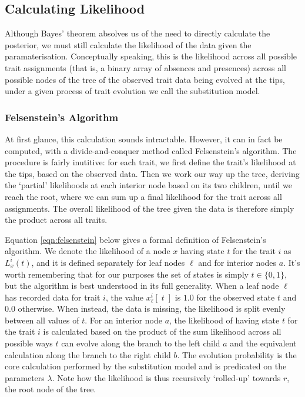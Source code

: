 \documentclass[10pt,journal,compsoc]{IEEEtran}
\begin{document}
\subsection{Calculating Likelihood}

Although Bayes' theorem absolves us of the need to directly calculate the posterior, we must still calculate the likelihood of the data given the paramaterisation. Conceptually speaking, this is the likelihood across all possible trait assignments (that is, a binary array of absences and presences) across all possible nodes of the tree of the observed trait data being evolved at the tips, under a given process of trait evolution we call the substitution model.

\subsubsection{Felsenstein's Algorithm}

At first glance, this calculation sounds intractable. However, it can in fact be computed, with a divide-and-conquer method called Felsenstein's algorithm. The procedure is fairly inutitive: for each trait, we first define the trait's likelihood at the tips, based on the observed data. Then we work our way up the tree, deriving the `partial' likelihoods at each interior node based on its two children, until we reach the root, where we can sum up a final likelihood for the trait across all assignments. The overall likelihood of the tree given the data is therefore simply the product across all traits.\cite{felsenstein2004inferring}

Equation \eqref{eqn:felsenstein} below gives a formal definition of Felsenstein's algorithm. We denote the likelihood of a node $x$ having state $t$ for the trait $i$ as $L_x^{i}(t)$, and it is defined separately for leaf nodes $\ell$ and for interior nodes $a$. It's worth remembering that for our purposes the set of states is simply $t \in \{0, 1\}$, but the algorithm is best understood in its full generality. When a leaf node $\ell$ has recorded data for trait $i$, the value $x_\ell^{i}\left[\;t\;\right]$ is $1.0$ for the observed state $t$ and $0.0$ otherwise. When instead, the data is missing, the likelihood is split evenly between all values of $t$. For an interior node $a$, the likelihood of having state $t$ for the trait $i$ is calculated based on the product of the sum likelihood across all possible ways $t$ can evolve along the branch to the left child $a$ and the equivalent calculation along the branch to the right child $b$. The evolution probability is the core calculation performed by the substitution model and is predicated on the parameters $\lambda$. Note how the likelihood is thus recursively `rolled-up' towards $r$, the root node of the tree.
\end{document}
